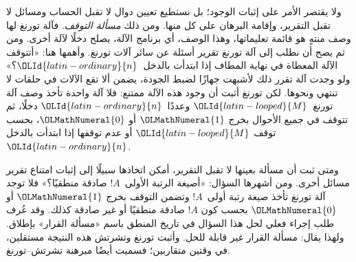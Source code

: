 \documentclass[../../../include/open-logic-section]{subfiles}
\begin{document}
ولا يقتصر الأمر على إثبات الوجود؛ بل نستطيع تعيين دوال لا تقبل
الحساب ومسائل لا تقبل التقرير، وإقامة البرهان على كل منها. ومن ذلك
\emph{مسألة التوقف}. فآلة تورنغ لها وصف منتهٍ هو قائمة تعليماتها،
وهذا الوصف، أي برنامج الآلة، يصلح دخلًا لآلة أخرى. ومن ثم يصح أن
نطلب إلى آلة تورنغ تقرير أسئلة عن سائر آلات تورنغ. وأهمها هنا:
«أتتوقف الآلة المعطاة في نهاية المطاف إذا ابتدأت بالدخل~${\OLId{latin-ordinary}{n}}$؟»
ولو وجدت آلة تقرر ذلك لأشبهت جهازًا لضبط الجودة، يضمن ألا تقع الآلات
في حلقات لا تنتهي ونحوها. لكن تورنغ أثبت أن وجود هذه الآلة ممتنع:
فلا آلة واحدة تأخذ وصف آلة تورنغ~${\OLId{latin-looped}{M}}$ وعددًا~${\OLId{latin-ordinary}{n}}$ دخلًا، ثم تتوقف
في جميع الأحوال بخرج ${\OLMathNumeral{1}}$ أو ${\OLMathNumeral{0}}$، بحسب توقف ${\OLId{latin-looped}{M}}$ أو عدم توقفها إذا
ابتدأت بالدخل~${\OLId{latin-ordinary}{n}}$.

ومتى ثبت أن مسألة بعينها لا تقبل التقرير، أمكن اتخاذها سبيلًا إلى
إثبات امتناع تقرير مسائل أخرى. ومن أشهرها السؤال:
«أصيغة الرتبة الأولى~$!A$ صادقة منطقيًا؟» فلا توجد آلة تورنغ تأخذ
صيغة رتبة أولى~$!A$ وتضمن التوقف بخرج ${\OLMathNumeral{1}}$ أو ${\OLMathNumeral{0}}$ بحسب كون
$!A$ صادقة منطقيًا أو غير صادقة كذلك. وقد عُرف طلب إجراء فعلي لحل
هذا السؤال في تاريخ المنطق باسم «مسألة القرار» بإطلاق. ولهذا يقال:
مسألة القرار غير قابلة للحل. وأثبت تورنغ وتشرتش هذه النتيجة
مستقلين، في وقتين متقاربين؛ فسميت أيضًا مبرهنة تشرتش--تورنغ.
\end{document}
